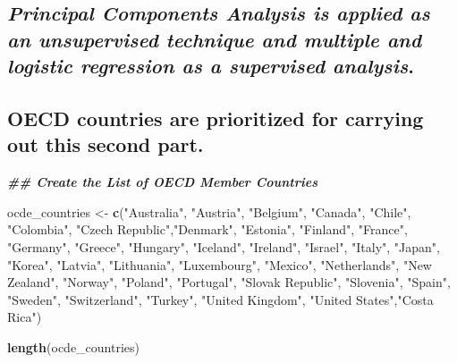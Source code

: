 \documentclass[
]{article}
\newenvironment{Shaded}{\begin{snugshade}}{\end{snugshade}}
\newcommand{\DocumentationTok}[1]{\textcolor[rgb]{0.56,0.35,0.01}{\textbf{\textit{#1}}}}
\newcommand{\FunctionTok}[1]{\textcolor[rgb]{0.13,0.29,0.53}{\textbf{#1}}}
\newcommand{\NormalTok}[1]{#1}
\newcommand{\OtherTok}[1]{\textcolor[rgb]{0.56,0.35,0.01}{#1}}
\newcommand{\StringTok}[1]{\textcolor[rgb]{0.31,0.60,0.02}{#1}}
\begin{document}
\subsection{\texorpdfstring{\emph{Principal Components Analysis is
applied as an unsupervised technique and multiple and logistic
regression as a supervised
analysis}.}{Principal Components Analysis is applied as an unsupervised technique and multiple and logistic regression as a supervised analysis.}}\label{principal-components-analysis-is-applied-as-an-unsupervised-technique-and-multiple-and-logistic-regression-as-a-supervised-analysis.}

\subsection{OECD countries are prioritized for carrying out this second
part.}\label{oecd-countries-are-prioritized-for-carrying-out-this-second-part.}

\begin{Shaded}
\begin{Highlighting}[]
\DocumentationTok{\#\# Create the List of OECD Member Countries}

\NormalTok{ocde\_countries }\OtherTok{\textless{}{-}} \FunctionTok{c}\NormalTok{(}\StringTok{"Australia"}\NormalTok{, }\StringTok{"Austria"}\NormalTok{, }\StringTok{"Belgium"}\NormalTok{, }\StringTok{"Canada"}\NormalTok{, }\StringTok{"Chile"}\NormalTok{, }\StringTok{"Colombia"}\NormalTok{, }\StringTok{"Czech Republic"}\NormalTok{,}\StringTok{"Denmark"}\NormalTok{, }\StringTok{"Estonia"}\NormalTok{, }\StringTok{"Finland"}\NormalTok{, }\StringTok{"France"}\NormalTok{, }\StringTok{"Germany"}\NormalTok{, }\StringTok{"Greece"}\NormalTok{, }\StringTok{"Hungary"}\NormalTok{, }
                    \StringTok{"Iceland"}\NormalTok{, }\StringTok{"Ireland"}\NormalTok{, }\StringTok{"Israel"}\NormalTok{, }\StringTok{"Italy"}\NormalTok{, }\StringTok{"Japan"}\NormalTok{, }\StringTok{"Korea"}\NormalTok{, }\StringTok{"Latvia"}\NormalTok{, }
                    \StringTok{"Lithuania"}\NormalTok{, }\StringTok{"Luxembourg"}\NormalTok{, }\StringTok{"Mexico"}\NormalTok{, }\StringTok{"Netherlands"}\NormalTok{, }\StringTok{"New Zealand"}\NormalTok{, }\StringTok{"Norway"}\NormalTok{,}
                    \StringTok{"Poland"}\NormalTok{, }\StringTok{"Portugal"}\NormalTok{, }\StringTok{"Slovak Republic"}\NormalTok{, }\StringTok{"Slovenia"}\NormalTok{, }\StringTok{"Spain"}\NormalTok{, }\StringTok{"Sweden"}\NormalTok{, }
                    \StringTok{"Switzerland"}\NormalTok{, }\StringTok{"Turkey"}\NormalTok{, }\StringTok{"United Kingdom"}\NormalTok{, }\StringTok{"United States"}\NormalTok{,}\StringTok{"Costa Rica"}\NormalTok{)}


\FunctionTok{length}\NormalTok{(ocde\_countries)}
\end{Highlighting}
\end{Shaded}
\end{document}
